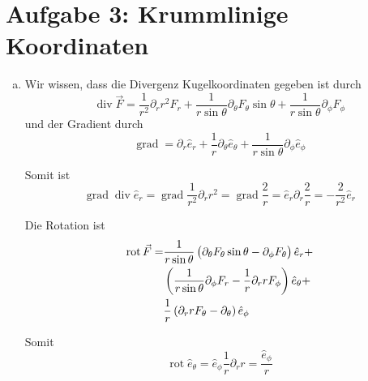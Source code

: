 \documentclass[a4paper,german,12pt,smallheadings]{scrartcl}
\begin{document}
\section*{Aufgabe 3: Krummlinige Koordinaten}
\begin{enumerate}[a)]
  \item
    Wir wissen, dass die Divergenz Kugelkoordinaten gegeben ist durch
    \begin{equation}
      \operatorname{div} \vec{F} = \frac{1}{r^2} \partial_r r^2 F_r + \frac{1}{r \sin \theta} \partial_\theta F_\theta \sin \theta + \frac{1}{r \sin \theta} \partial_\phi F_\phi
    \end{equation}
    und der Gradient durch
    \begin{equation}
      \operatorname{grad} = \partial_r \hat{e}_r + \frac{1}{r} \partial_\theta \hat{e}_\theta + \frac{1}{r \sin \theta} \partial_\phi \hat{e}_\phi
    \end{equation}

    Somit ist
    \begin{equation}
        \operatorname{grad} \operatorname{div} \hat{e}_r
      = \operatorname{grad} \frac{1}{r^2} \partial_r r^2
      = \operatorname{grad} \frac{2}{r}
      = \hat{e}_r \partial_r \frac{2}{r}
      = -\frac{2}{r^2} \hat{e}_r
    \end{equation}

    Die Rotation ist
    \begin{align}
      \operatorname{rot} \vec{F} =
      &\frac{1}{r \sin \theta} \del{\partial_\theta F_\theta \sin \theta - \partial_\phi F_\theta} \hat{e}_r + \\
      &\del{\frac{1}{r \sin \theta} \partial_\phi F_r - \frac{1}{r} \partial_r r F_\phi} \hat{e}_\theta + \\
      &\frac{1}{r} \del{\partial_r r F_\theta - \partial_\theta} \hat{e}_\phi
    \end{align}

    Somit
    \begin{equation}
      \operatorname{rot} \hat{e}_\theta = \hat{e}_\phi \frac{1}{r} \partial_r r = \frac{\hat{e}_\phi}{r}
    \end{equation}

\end{enumerate}
\end{document}
